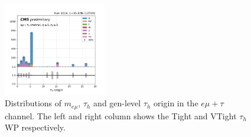\begin{figure}
    \includegraphics[width=0.4\textwidth]{chapters/Analysis/sectionCalibration/figures/jetToTauh/emutau_tauGenFlavor_pickles_lltauVTight.png}
    \caption{Distributions of $m_{e\mu}$, $\tau_h$ \pt and gen-level $\tau_h$ origin in the $e\mu+\tau$ channel. The left and right column shows the Tight and VTight $\tau_h$ WP respectively.}
    \label{fig:appendix:fakeTauId:emutau}
\end{figure}

